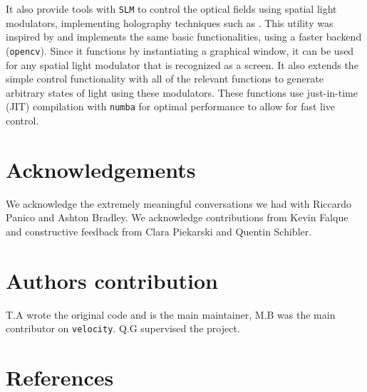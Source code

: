 \documentclass[aps,prl,groupedaddress,amsmath,amssymb]{revtex4-2}
\begin{document}
It also provide tools with \texttt{SLM} to control the optical fields
using spatial light modulators, implementing holography techniques such
as \cite{bolducExactSolutionSimultaneous2013}. 
This utility was inspired
by \cite{sebastien_m_popoff_2017_293042} and implements the same
basic functionalities, using a faster backend (\texttt{opencv}). 
Since
it functions by instantiating a graphical window, it can be used for any
spatial light modulator that is recognized as a screen. 
It also extends
the simple control functionality with all of the relevant functions to
generate arbitrary states of light using these modulators. 
These
functions use just-in-time (JIT) compilation with \texttt{numba} for optimal
performance to allow for fast live control.

\section{Acknowledgements\label{acknowledgements}}

We acknowledge the extremely meaningful conversations we had with
Riccardo Panico and Ashton Bradley. We acknowledge contributions from
Kevin Falque and constructive feedback from Clara Piekarski and Quentin
Schibler.

\section{Authors contribution\label{authors-contribution}}

T.A wrote the original code and is the main maintainer, M.B was the main
contributor on \texttt{velocity}. Q.G supervised the project.

\section{References\label{references}}


\end{document}
